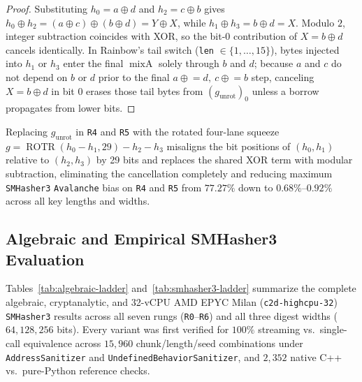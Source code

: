 \documentclass[10pt]{article}
\theoremstyle{definition}
\newcommand{\ROTR}{\operatorname{ROTR}}
\newcommand{\mixA}{\operatorname{mixA}}
\newcommand{\code}[1]{\texttt{#1}}
\begin{document}
\begin{proof}
Substituting $h_0 = a \oplus d$ and $h_2 = c \oplus b$ gives $h_0 \oplus h_2 = (a \oplus c) \oplus (b \oplus d) = Y \oplus X$, while $h_1 \oplus h_3 = b \oplus d = X$. Modulo $2$, integer subtraction coincides with XOR, so the bit-0 contribution of $X = b \oplus d$ cancels identically. In Rainbow's tail switch (\code{len} $\in \{1,\dots,15\}$), bytes injected into $h_1$ or $h_3$ enter the final $\mixA$ solely through $b$ and $d$; because $a$ and $c$ do not depend on $b$ or $d$ prior to the final $a \mathrel{\oplus}= d,\ c \mathrel{\oplus}= b$ step, canceling $X = b \oplus d$ in bit 0 erases those tail bytes from $(g_{\text{unrot}})_0$ unless a borrow propagates from lower bits.
\end{proof}

Replacing $g_{\text{unrot}}$ in \code{R4} and \code{R5} with the rotated four-lane squeeze $g = \ROTR(h_0 - h_1, 29) - h_2 - h_3$ misaligns the bit positions of $(h_0, h_1)$ relative to $(h_2, h_3)$ by 29 bits and replaces the shared XOR term with modular subtraction, eliminating the cancellation completely and reducing maximum \code{SMHasher3} \code{Avalanche} bias on \code{R4} and \code{R5} from $77.27\%$ down to $0.68\%$--$0.92\%$ across all key lengths and widths.

\subsection{Algebraic and Empirical SMHasher3 Evaluation}
\label{sec:results-ladder}

Tables~\ref{tab:algebraic-ladder} and~\ref{tab:smhasher3-ladder} summarize the complete algebraic, cryptanalytic, and 32-vCPU AMD EPYC Milan (\code{c2d-highcpu-32}) \code{SMHasher3} results across all seven rungs (\code{R0}--\code{R6}) and all three digest widths ($64, 128, 256$ bits). Every variant was first verified for $100\%$ streaming vs.\ single-call equivalence across $15{,}960$ chunk/length/seed combinations under \code{AddressSanitizer} and \code{UndefinedBehaviorSanitizer}, and $2{,}352$ native C++ vs.\ pure-Python reference checks.
\end{document}
